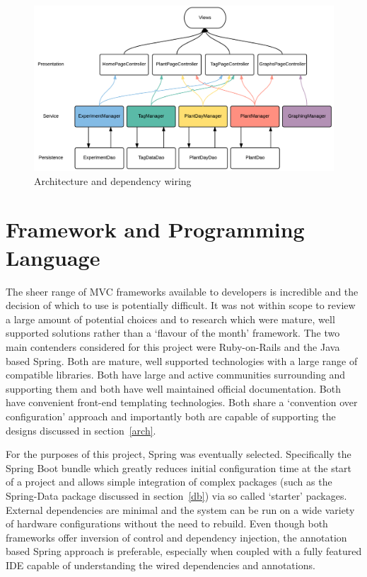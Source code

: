 \begin{figure}[H]
    \centering
    \includegraphics[width=\textwidth]{images/design/arch1}
    \caption{Architecture and dependency wiring}
    \label{fig:arch1}
\end{figure}

\section{Framework and Programming Language}\label{framework}

The sheer range of MVC frameworks available to developers is incredible and the decision of which to use is potentially difficult. It was not within scope to review a large amount of potential choices and to research which were mature, well supported solutions rather than a `flavour of the month' framework. The two main contenders considered for this project were Ruby-on-Rails and the Java based Spring. Both are mature, well supported technologies with a large range of compatible libraries. Both have large and active communities surrounding and supporting them and both have well maintained official documentation. Both have convenient front-end templating technologies. Both share a  `convention over configuration' approach and importantly both are capable of supporting the designs discussed in section~\ref{arch}.

For the purposes of this project, Spring was eventually selected. Specifically the Spring Boot\cite{_boot} bundle which greatly reduces initial configuration time at the start of a project and allows simple integration of complex packages (such as the Spring-Data package discussed in section~\ref{db}) via so called `starter' packages. External dependencies are minimal and the system can be run on a wide variety of hardware configurations without the need to rebuild. 
 Even though both frameworks offer inversion of control and dependency injection, the annotation based Spring approach is preferable, especially when coupled with a fully featured IDE capable of understanding the wired dependencies and annotations. 

